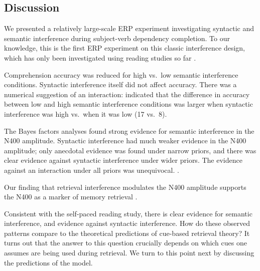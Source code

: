 \documentclass[a4paper, man, floatsintext]{apa7}
\begin{document}
\subsection{Discussion}
We presented a relatively large-scale ERP experiment investigating syntactic and semantic interference during subject-verb dependency completion. To our knowledge, this is the first ERP experiment on this classic interference design, which has only been investigated using reading studies so far \parencite{mertzen,vandyke07}. 

Comprehension accuracy was reduced for high vs.\ low semantic interference conditions. 
Syntactic interference itself did not affect accuracy. There was a numerical suggestion of an interaction: indicated that the difference in accuracy between low and high semantic interference conditions was larger when syntactic interference was high vs.\ when it was low (17 vs.\ 8). 

The Bayes factors analyses found strong evidence for semantic interference in the N400 amplitude. Syntactic interference had much weaker evidence in the N400 amplitude; only anecdotal evidence was found under narrow priors, and there was clear evidence against syntactic interference under wider priors. The evidence against an interaction under all priors was unequivocal. . 

Our finding that retrieval interference modulates the N400 amplitude supports the N400 as a marker of memory retrieval \citep{kutas&federmeier_2000, kutas_federmeier2011, brouwer2017_n4_p6, lau2008_n400}.

Consistent with the self-paced reading study, there is clear evidence for semantic interference, and evidence against syntactic interference.  How do these observed patterns compare to the theoretical predictions of cue-based retrieval theory? It turns out that the answer to this question crucially depends on which cues one assumes are being used during retrieval. We turn to this point next by discussing the predictions of the \cite{Lewis2005} model.

\end{document}

